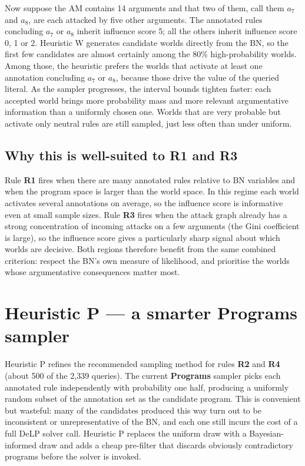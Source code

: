 \documentclass[11pt,a4paper]{article}
\newcommand{\programs}{\textcolor{programsorange}{\textbf{Programs}}}
\begin{document}
Now suppose the AM contains 14 arguments and that two of them, call them $a_7$ and $a_8$, are each attacked by five other arguments. The annotated rules concluding $a_7$ or $a_8$ inherit influence score 5; all the others inherit influence score 0, 1 or 2. Heuristic W generates candidate worlds directly from the BN, so the first few candidates are almost certainly among the 80\% high-probability worlds. Among those, the heuristic prefers the worlds that activate at least one annotation concluding $a_7$ or $a_8$, because those drive the value of the queried literal. As the sampler progresses, the interval bounds tighten faster: each accepted world brings more probability mass and more relevant argumentative information than a uniformly chosen one. Worlds that are very probable but activate only neutral rules are still sampled, just less often than under uniform.

\subsection*{Why this is well-suited to R1 and R3}

Rule \textbf{R1} fires when there are many annotated rules relative to BN variables and when the program space is larger than the world space. In this regime each world activates several annotations on average, so the influence score is informative even at small sample sizes. Rule \textbf{R3} fires when the attack graph already has a strong concentration of incoming attacks on a few arguments (the Gini coefficient is large), so the influence score gives a particularly sharp signal about which worlds are decisive. Both regions therefore benefit from the same combined criterion: respect the BN's own measure of likelihood, and prioritise the worlds whose argumentative consequences matter most.

\newpage

\section*{Heuristic P --- a smarter \programs{} sampler}

Heuristic P refines the recommended sampling method for rules \textbf{R2} and \textbf{R4} (about 500 of the 2{,}339 queries). The current \programs{} sampler picks each annotated rule independently with probability one half, producing a uniformly random subset of the annotation set as the candidate program. This is convenient but wasteful: many of the candidates produced this way turn out to be inconsistent or unrepresentative of the BN, and each one still incurs the cost of a full DeLP solver call. Heuristic P replaces the uniform draw with a Bayesian-informed draw and adds a cheap pre-filter that discards obviously contradictory programs before the solver is invoked.
\end{document}
